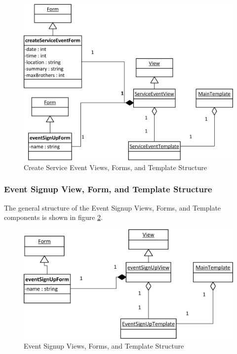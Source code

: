 \documentclass{article}
\begin{document}
\FloatBarrier
\begin{figure}[h!]
\centering
\includegraphics[scale=.65]{img/viewFormTemplateDiagrams/createServiceEvent}
\caption{Create Service Event Views, Forms, and Template Structure}
\label{fig:createServiceEventViewFormTemplateDiagram}
\end{figure}
\FloatBarrier

\subsubsection{Event Signup View, Form, and Template Structure}

The general structure of the Event Signup Views, Forms, and Template components is shown in figure \ref{fig:eventSignupViewFormTemplateDiagram}.

\FloatBarrier
\begin{figure}[h!]
\centering
\includegraphics[scale=.65]{img/viewFormTemplateDiagrams/eventSignUp}
\caption{Event Signup Views, Forms, and Template Structure}
\label{fig:eventSignupViewFormTemplateDiagram}
\end{figure}
\FloatBarrier
\end{document}
